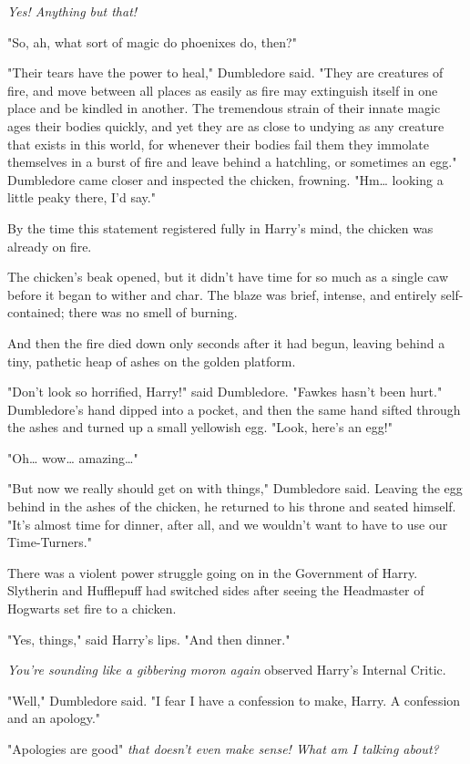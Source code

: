\emph{Yes! Anything but that!}

"So, ah, what sort of magic do phoenixes do, then?"

"Their tears have the power to heal," Dumbledore said. "They are creatures of 
fire, and move between all places as easily as fire may extinguish itself in 
one place and be kindled in another. The tremendous strain of their innate 
magic ages their bodies quickly, and yet they are as close to undying as any 
creature that exists in this world, for whenever their bodies fail them they 
immolate themselves in a burst of fire and leave behind a hatchling, or 
sometimes an egg." Dumbledore came closer and inspected the chicken, frowning. 
"Hm{\ldots} looking a little peaky there, I'd say."

By the time this statement registered fully in Harry's mind, the chicken was 
already on fire.

The chicken's beak opened, but it didn't have time for so much as a single caw 
before it began to wither and char. The blaze was brief, intense, and entirely 
self-contained; there was no smell of burning.

And then the fire died down only seconds after it had begun, leaving behind a 
tiny, pathetic heap of ashes on the golden platform.

"Don't look so horrified, Harry!" said Dumbledore. "Fawkes hasn't been hurt." 
Dumbledore's hand dipped into a pocket, and then the same hand sifted through 
the ashes and turned up a small yellowish egg. "Look, here's an egg!"

"Oh{\ldots} wow{\ldots} amazing{\ldots}"

"But now we really should get on with things," Dumbledore said. Leaving the egg 
behind in the ashes of the chicken, he returned to his throne and seated 
himself. "It's almost time for dinner, after all, and we wouldn't want to have 
to use our Time-Turners."

There was a violent power struggle going on in the Government of Harry. 
Slytherin and Hufflepuff had switched sides after seeing the Headmaster of 
Hogwarts set fire to a chicken.

"Yes, things," said Harry's lips. "And then dinner."

\emph{You're sounding like a gibbering moron again} observed Harry's Internal 
Critic.

"Well," Dumbledore said. "I fear I have a confession to make, Harry. A 
confession and an apology."

"Apologies are good" \emph{that doesn't even make sense! What am I talking 
about?}

